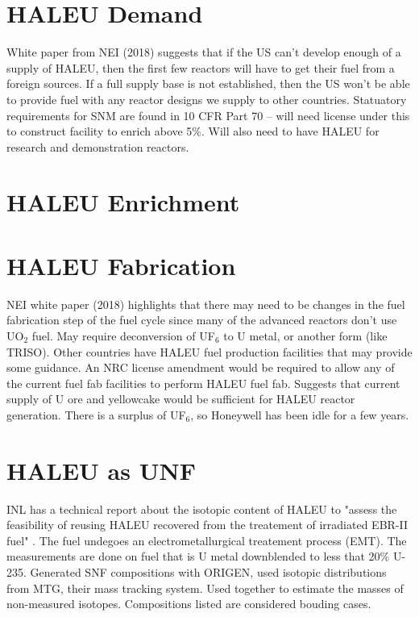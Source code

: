 \documentclass{article}
\begin{document}
\section{HALEU Demand}
White paper from NEI (2018) suggests that if the US can't develop 
enough of a supply of HALEU, then the first few reactors will have 
to get their fuel from a foreign sources. If a full supply base 
is not established, then the US won't be able to provide fuel 
with any reactor designs we supply to other countries. Statuatory
requirements for SNM are found in 10 CFR Part 70 -- will need license 
under this to construct facility to enrich above 5\%. Will also need 
to have HALEU for research and demonstration reactors. 

\section{HALEU Enrichment}

\section{HALEU Fabrication}
NEI white paper (2018) highlights that there may need to be changes 
in the fuel fabrication step of the fuel cycle since many of the 
advanced reactors don't use UO$_2$ fuel. May require deconversion 
of UF$_6$ to U metal, or another form (like TRISO). Other countries 
have HALEU fuel production facilities that may provide some guidance. 
An NRC license amendment would be required to allow any of the 
current fuel fab facilities to perform HALEU fuel fab. Suggests 
that current supply of U ore and yellowcake would be sufficient for 
HALEU reactor generation. There is a surplus of UF$_6$, so Honeywell 
has been idle for a few years. 

\section{HALEU as UNF}
INL has a technical report about the isotopic content of HALEU to 
"assess the feasibility of reusing HALEU recovered from the treatement 
of irradiated EBR-II fuel" \cite{vaden_isotopic_2018}. The fuel undegoes 
an electrometallurgical treatement process (EMT). The measurements
are done on fuel that is U metal downblended to less that 20\% U-235.
Generated SNF compositions with ORIGEN, used isotopic distributions from 
MTG, their mass tracking system. Used together to estimate the masses of 
non-measured isotopes. Compositions listed are considered bouding cases. 
\end{document}
